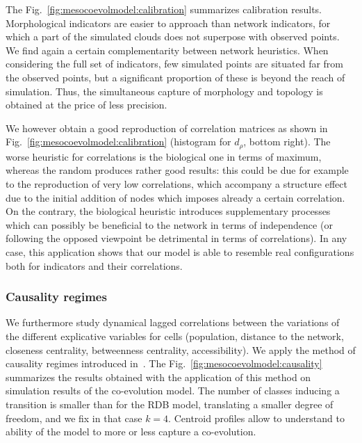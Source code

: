 The Fig.~\ref{fig:mesocoevolmodel:calibration} summarizes calibration results. Morphological indicators are easier to approach than network indicators, for which a part of the simulated clouds does not superpose with observed points. We find again a certain complementarity between network heuristics. When considering the full set of indicators, few simulated points are situated far from the observed points, but a significant proportion of these is beyond the reach of simulation. Thus, the simultaneous capture of morphology and topology is obtained at the price of less precision.


We however obtain a good reproduction of correlation matrices as shown in Fig.~\ref{fig:mesocoevolmodel:calibration} (histogram for $d_{\rho}$, bottom right). The worse heuristic for correlations is the biological one in terms of maximum, whereas the random produces rather good results: this could be due for example to the reproduction of very low correlations, which accompany a structure effect due to the initial addition of nodes which imposes already a certain correlation. On the contrary, the biological heuristic introduces supplementary processes which can possibly be beneficial to the network in terms of independence (or following the opposed viewpoint be detrimental in terms of correlations). In any case, this application shows that our model is able to resemble real configurations both for indicators and their correlations.



\subsubsection{Causality regimes}


We furthermore study dynamical lagged correlations between the variations of the different explicative variables for cells (population, distance to the network, closeness centrality, betweenness centrality, accessibility). We apply the method of causality regimes introduced in~\cite{raimbault2017identification}. The Fig.~\ref{fig:mesocoevolmodel:causality} summarizes the results obtained with the application of this method on simulation results of the co-evolution model. The number of classes inducing a transition is smaller than for the RDB model, translating a smaller degree of freedom, and we fix in that case $k=4$. Centroid profiles allow to understand to ability of the model to more or less capture a co-evolution.



